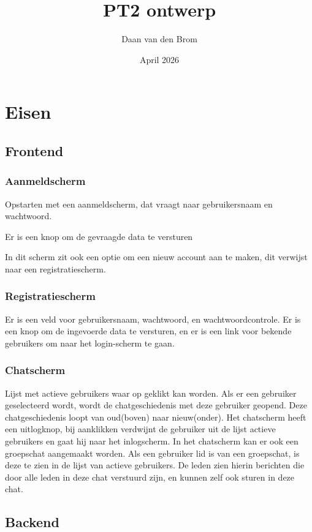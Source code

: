\documentclass{article}
\title{PT2 ontwerp}
\author{Daan van den Brom}
\date{April 2026}
\begin{document}
\maketitle

\section*{Eisen}
\subsection*{Frontend}
\subsubsection*{Aanmeldscherm}
Opstarten met een aanmeldscherm, dat vraagt naar gebruikersnaam en wachtwoord.

Er is een knop om de gevraagde data te versturen

In dit scherm zit ook een optie om een nieuw account aan te maken, dit verwijst naar een registratiescherm.

\subsubsection*{Registratiescherm}
Er is een veld voor gebruikersnaam, wachtwoord, en wachtwoordcontrole. Er is een knop om de ingevoerde data te versturen, en er is een link voor bekende gebruikers om naar het login-scherm te gaan.

\subsubsection*{Chatscherm}
Lijst met actieve gebruikers waar op geklikt kan worden. Als er een gebruiker geselecteerd wordt, wordt de chatgeschiedenis met deze gebruiker geopend. Deze chatgeschiedenis loopt van oud(boven) naar nieuw(onder).
Het chatscherm heeft een uitlogknop, bij aanklikken verdwijnt de gebruiker uit de lijst actieve gebruikers en gaat hij naar het inlogscherm.
In het chatscherm kan er ook een groepschat aangemaakt worden. Als een gebruiker lid is van een groepschat, is deze te zien in de lijst van actieve gebruikers. De leden zien hierin berichten die door alle leden in deze chat verstuurd zijn, en kunnen zelf ook sturen in deze chat. 

\subsection*{Backend}
\end{document}
